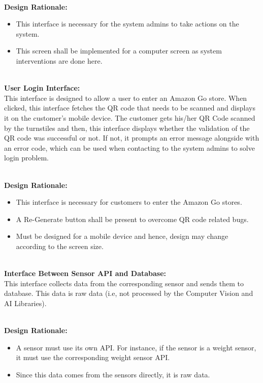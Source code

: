 \documentclass[11pt]{article}
\newcounter{subsubsubsection}[subsubsection]
\begin{document}
    \textbf{\\Design Rationale:}
    \begin{itemize}
       \item This interface is necessary for the system admins to take actions on the system.
       \item This screen shall be implemented for a computer screen as system interventions are done here.
    \end{itemize}
    
    \textbf{\\User Login Interface:\\}
    This interface is designed to allow a user to enter an Amazon Go store. When clicked, this interface fetches the QR code that needs to be scanned 
    and displays it on the customer's mobile device. The customer gets his/her QR Code scanned by the turnstiles and then, this interface displays whether the 
    validation of the QR code was successful or not. If not, it prompts an error message alongside with an error code, which can be used when contacting to the system admins 
    to solve login problem. 

    \textbf{\\Design Rationale:}
    \begin{itemize}
       \item This interface is necessary for customers to enter the Amazon Go stores.
       \item A Re-Generate button shall be present to overcome QR code related bugs.
       \item Must be designed for a mobile device and hence, design may change according to the screen size.
    \end{itemize}
    

    \textbf{\\Interface Between Sensor API and Database:\\}
    This interface collects data from the corresponding sensor and sends them to database. This data is raw data (i.e, not processed by the Computer Vision and AI Libraries).
    
    \textbf{\\Design Rationale:}
    \begin{itemize}
       \item A sensor must use its own API. For instance, if the sensor is a weight sensor, it must use the corresponding weight sensor API.
        \item Since this data comes from the sensors directly, it is raw data. 
    \end{itemize}
\end{document}

